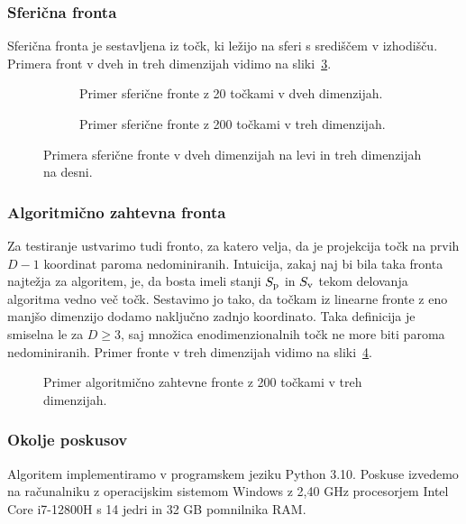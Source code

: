 \subsubsection{Sferična fronta}
Sferična fronta je sestavljena iz točk, ki ležijo na sferi s središčem v izhodišču. Primera front v dveh in treh dimenzijah vidimo na sliki~\ref{fig:spherical_front}.
\begin{figure}[th]
    \begin{subfigure}{0.45\textwidth}
        \centering
        
        \caption{Primer sferične fronte z 20 točkami v dveh dimenzijah.}
        \label{fig:front_spherical_2d}
    \end{subfigure}
    \hfill
    \begin{subfigure}{0.45\textwidth}
        \centering
        
        \caption{Primer sferične fronte z 200 točkami v treh dimenzijah.}
        \label{fig:front_spherical_3d}
    \end{subfigure}
    \caption{Primera sferične fronte v dveh dimenzijah na levi in treh dimenzijah na desni.}
    \label{fig:spherical_front}
\end{figure}

\subsubsection{Algoritmično zahtevna fronta} 
Za testiranje ustvarimo tudi fronto, za katero velja, da je projekcija točk na prvih $D-1$ koordinat paroma nedominiranih. Intuicija, zakaj naj bi bila taka fronta najtežja za algoritem, je, da bosta imeli stanji $\sp$ in $\sv$ tekom delovanja algoritma vedno več točk. Sestavimo jo tako, da točkam iz linearne fronte z eno manjšo dimenzijo dodamo naključno zadnjo koordinato. Taka definicija je smiselna le za $D \geq 3$, saj množica enodimenzionalnih točk ne more biti paroma nedominiranih. Primer fronte v treh dimenzijah vidimo na sliki~\ref{fig:front_worst_case}.
\begin{figure}[th]
    \centering
    
    \caption{Primer algoritmično zahtevne fronte z 200 točkami v treh dimenzijah.}
    \label{fig:front_worst_case}
\end{figure}


\subsubsection{Okolje poskusov}
Algoritem implementiramo v programskem jeziku Python 3.10. Poskuse izvedemo na računalniku z operacijskim sistemom Windows z 2,40 GHz procesorjem Intel Core i7-12800H s 14 jedri in 32 GB pomnilnika RAM.

